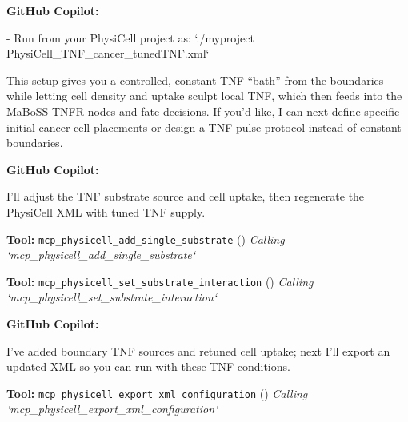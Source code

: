 \documentclass[11pt,a4paper]{article}
\begin{document}
\begin{copilotbox}
\textbf{GitHub Copilot:}

- Run from your PhysiCell project as:  
    `./myproject PhysiCell\_TNF\_cancer\_tunedTNF.xml`

This setup gives you a controlled, constant TNF “bath” from the boundaries while letting cell density and uptake sculpt local TNF, which then feeds into the MaBoSS TNFR nodes and fate decisions. If you’d like, I can next define specific initial cancer cell placements or design a TNF pulse protocol instead of constant boundaries.

\end{copilotbox}
\begin{copilotbox}
\textbf{GitHub Copilot:}

I’ll adjust the TNF substrate source and cell uptake, then regenerate the PhysiCell XML with tuned TNF supply.

\end{copilotbox}
\begin{toolokbox}
\textbf{Tool:} \texttt{mcp\_physicell\_add\_single\_substrate} (\checkmark)
\textit{Calling `mcp\_physicell\_add\_single\_substrate`}
\end{toolokbox}
\begin{toolokbox}
\textbf{Tool:} \texttt{mcp\_physicell\_set\_substrate\_interaction} (\checkmark)
\textit{Calling `mcp\_physicell\_set\_substrate\_interaction`}
\end{toolokbox}
\begin{copilotbox}
\textbf{GitHub Copilot:}

I’ve added boundary TNF sources and retuned cell uptake; next I’ll export an updated XML so you can run with these TNF conditions.

\end{copilotbox}
\begin{toolokbox}
\textbf{Tool:} \texttt{mcp\_physicell\_export\_xml\_configuration} (\checkmark)
\textit{Calling `mcp\_physicell\_export\_xml\_configuration`}
\end{toolokbox}
\end{document}
